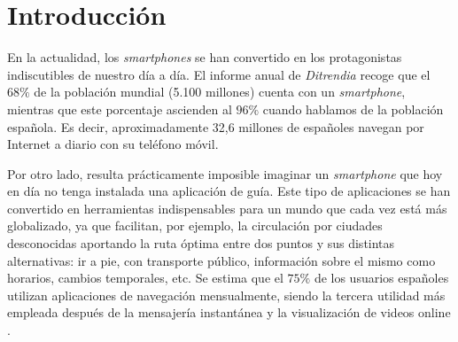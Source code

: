 \chapter{Introducción}
\label{cap:introduccion}




	

En la actualidad, los \textit{smartphones} se han convertido en los protagonistas indiscutibles de nuestro día a día. El informe anual de \textit{Ditrendia} \citep{ditrendia2019informe} recoge que el $68\%$ de la población mundial (5.100 millones) cuenta con un \textit{smartphone}, mientras que este porcentaje ascienden al $96\%$ cuando hablamos de la población española. Es decir, aproximadamente 32,6 millones de españoles navegan por Internet a diario con su teléfono móvil. 

Por otro lado, resulta prácticamente imposible imaginar un \textit{smartphone} que hoy en día no tenga instalada una aplicación de guía. Este tipo de aplicaciones se han convertido en herramientas indispensables para un mundo que cada vez está más globalizado, ya que facilitan, por ejemplo, la circulación por ciudades desconocidas aportando la ruta óptima entre dos puntos y sus distintas alternativas: ir a pie, con transporte público, información sobre el mismo como horarios, cambios temporales, etc. Se estima que el $75\%$ de los usuarios españoles utilizan aplicaciones de navegación mensualmente, siendo la tercera utilidad más empleada después de la mensajería instantánea y la visualización de videos online \citep{ditrendia2019informe}.

